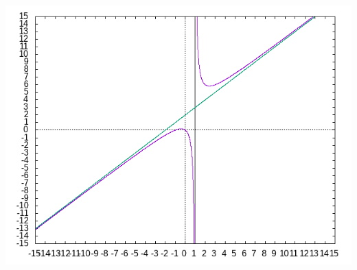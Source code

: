 \documentclass[11pt]{scrartcl}
\begin{document}
\begin{enumerate}
\begin{center}
				\includegraphics[scale=0.6]{funkcja1}
			\end{center}
			
	\end{enumerate}

	
\end{document}
